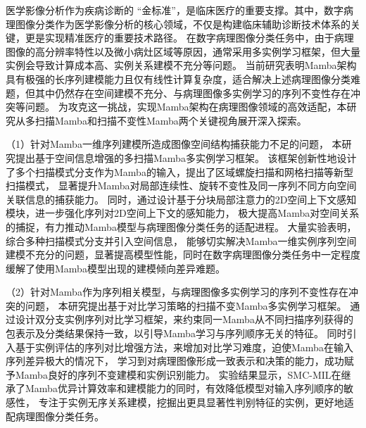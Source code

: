 \begin{cabstract}	%
医学影像分析作为疾病诊断的 “金标准”，是临床医疗的重要支撑。其中，数字病理图像分类作为医学影像分析的核心领域，不仅是构建临床辅助诊断技术体系的关键，更是实现精准医疗的重要技术路径。
在数字病理图像分类任务中，由于病理图像的高分辨率特性以及微小病灶区域等原因，通常采用多实例学习框架，但大量实例会导致计算成本高、实例关系建模不充分等问题。
当前研究表明Mamba架构具有极强的长序列建模能力且仅有线性计算复杂度，适合解决上述病理图像分类难题，但其中仍然存在空间建模不充分、与病理图像多实例学习的序列不变性存在冲突等问题。
为攻克这一挑战，实现Mamba架构在病理图像领域的高效适配，本研究从多扫描Mamba和扫描不变性Mamba两个关键视角展开深入探索。

（1）针对Mamba一维序列建模所造成图像空间结构捕获能力不足的问题，
本研究提出基于空间信息增强的多扫描Mamba多实例学习框架。
该框架创新性地设计了多个扫描模式分支作为Mamba的输入，提出了区域螺旋扫描和网格扫描等新型扫描模式，
显著提升Mamba对局部连续性、旋转不变性及同一序列不同方向空间关联信息的捕获能力。
同时，通过设计基于分块局部注意力的2D空间上下文感知模块，进一步强化序列对2D空间上下文的感知能力，
极大提高Mamba对空间关系的捕捉，有力推动Mamba模型与病理图像分类任务的适配进程。
大量实验表明，综合多种扫描模式分支并引入空间信息，
能够切实解决Mamba一维实例序列空间建模不充分的问题，显著提高模型性能，同时在数字病理图像分类任务中一定程度缓解了使用Mamba模型出现的建模倾向差异难题。​

（2）针对Mamba作为序列相关模型，与病理图像多实例学习的序列不变性存在冲突的问题，
本研究提出基于对比学习策略的扫描不变Mamba多实例学习框架。
通过设计双分支实例序列对比学习框架，来约束同一Mamba从不同扫描序列获得的包表示及分类结果保持一致，以引导Mamba学习与序列顺序无关的特征。
同时引入基于实例评估的序列对比增强方法，来增加对比学习难度，迫使Mamba在输入序列差异极大的情况下，
学习到对病理图像形成一致表示和决策的能力，成功赋予Mamba良好的序列不变建模和实例识别能力。
实验结果显示，SMC-MIL在继承了Mamba优异计算效率和建模能力的同时，有效降低模型对输入序列顺序的敏感性，
专注于实例无序关系建模，挖掘出更具显著性判别特征的实例，更好地适配病理图像分类任务。

\end{cabstract}

